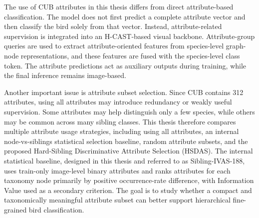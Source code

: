 The use of CUB attributes in this thesis differs from direct attribute-based classification. The model does not first predict a complete attribute vector and then classify the bird solely from that vector. Instead, attribute-related supervision is integrated into an H-CAST-based visual backbone. Attribute-group queries are used to extract attribute-oriented features from species-level graph-node representations, and these features are fused with the species-level class token. The attribute predictions act as auxiliary outputs during training, while the final inference remains image-based.

Another important issue is attribute subset selection. Since CUB contains 312 attributes, using all attributes may introduce redundancy or weakly useful supervision. Some attributes may help distinguish only a few species, while others may be common across many sibling classes. This thesis therefore compares multiple attribute usage strategies, including using all attributes, an internal node-vs-siblings statistical selection baseline, random attribute subsets, and the proposed Hard-Sibling Discriminative Attribute Selection (HSDAS). The internal statistical baseline, designed in this thesis and referred to as Sibling-IVAS-188, uses train-only image-level binary attributes and ranks attributes for each taxonomy node primarily by positive occurrence-rate difference, with Information Value used as a secondary criterion. The goal is to study whether a compact and taxonomically meaningful attribute subset can better support hierarchical fine-grained bird classification.

